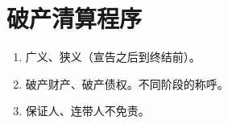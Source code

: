 \section{破产清算程序}
\begin{enumerate}
  \item 广义、狭义（宣告之后到终结前）。
  \item 破产财产、破产债权。不同阶段的称呼。
  \item 保证人、连带人不免责。
\end{enumerate}

